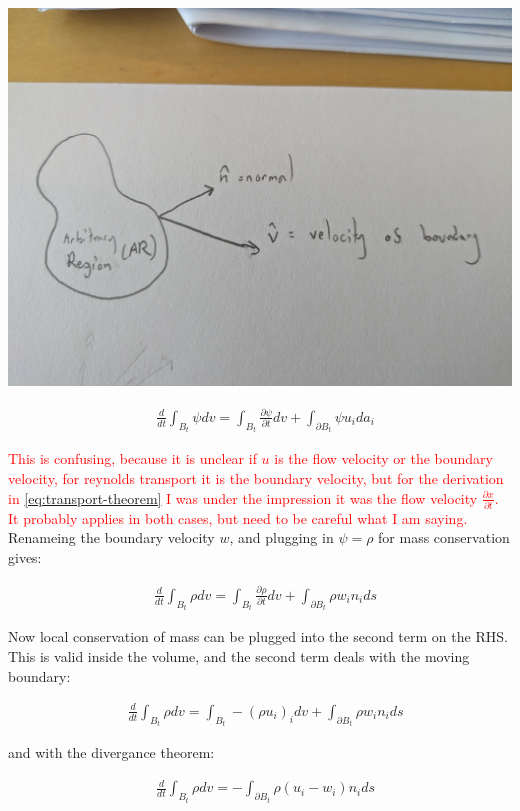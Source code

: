 \documentclass[a4paper,12pt]{article}
\newcommand{\pd}[2]{\frac{\partial #1}{\partial #2}}
\begin{document}
\includegraphics[scale=.07]{moving_boundary.jpg}


\begin{align}
  &\frac{d}{dt}\int_{B_t} \psi dv = \int_{B_t} \pd{\psi}{t}dv + \int_{\partial B_t} \psi u_i da_i
\end{align}

\textcolor{red}{This is confusing, because it is unclear if $u$ is the flow velocity or the boundary velocity, for reynolds transport it is the boundary velocity, but for the derivation in \eqref{eq:transport-theorem} I was under the impression it was the flow velocity $\pd{x}{t}$. It probably applies in both cases, but need to be careful what I am saying.} Renameing the boundary velocity $w$, and plugging in $\psi = \rho$ for mass conservation gives:

\begin{align}
  &\frac{d}{dt}\int_{B_t} \rho dv = \int_{B_t} \pd{\rho}{t}dv + \int_{\partial B_t} \rho w_i n_i ds
\end{align}

Now local conservation of mass can be plugged into the second term on the RHS. This is valid inside the volume, and the second term deals with the moving boundary:

\begin{align}
  &\frac{d}{dt}\int_{B_t} \rho dv = \int_{B_t} -(\rho u_i)_idv + \int_{\partial B_t} \rho w_i n_i ds
\end{align}

and with the divergance theorem:

\begin{align}
  &\frac{d}{dt}\int_{B_t} \rho dv = -\int_{\partial B_t} \rho (u_i - w_i) n_i ds
\end{align}
\end{document}

